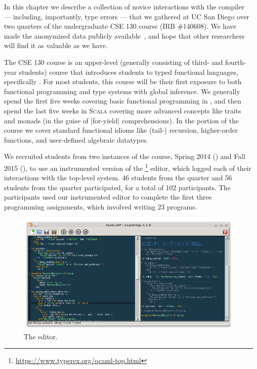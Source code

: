 In this chapter we describe a collection of novice interactions with the
\ocaml compiler --- including, importantly, type errors --- that we
gathered at UC San Diego over two quarters of the undergraduate CSE 130
course (IRB \#140608).
%
We have made the anonymized data publicly
available~\citep{Seidel2017-ko}, and hope that other researchers will
find it as valuable as we have.

The CSE 130 course is an upper-level (\ie generally consisting of third-
and fourth-year students) course that introduces students to typed
functional languages, specifically \ocaml.
%
For most students, this course will be their first exposure to both
functional programming and type systems with global inference.
%
We generally spend the first five weeks covering basic functional
programming in \ocaml, and then spend the last five weeks in
\textsc{Scala} covering more advanced concepts like traits and
monads (in the guise of |for-yield| comprehensions).
%
In the \ocaml portion of the course we cover standard functional idioms
like (tail-) recursion, higher-order functions, and user-defined
algebraic datatypes.

We recruited students from two instances of the course, Spring 2014
(\SPRING) and Fall 2015 (\FALL), to use an instrumented version of the
\ocamltop\footnote{\url{https://www.typerex.org/ocaml-top.html}} editor, which logged each of their
interactions with the \ocaml top-level system.
%
46 students from the \SPRING quarter and 56 students from the \FALL
quarter participated, for a total of 102 participants.
%
The participants used our instrumented editor to complete the first
three programming assignments, which involved writing 23 \ocaml
programs.
%

\begin{figure}
\centering
\includegraphics[width=\linewidth]{ocaml-top.png}
\caption{The \ocamltop editor. }
\label{fig:intro:ocaml-top}
\end{figure}

